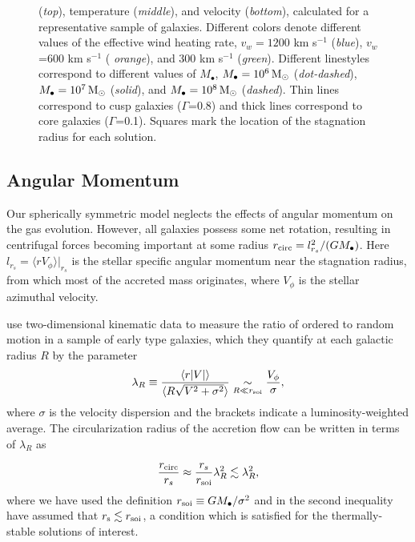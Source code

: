 \documentclass[usenatbib,fleqn]{mn2e}
\newcommand{\Mbh}[1][]{M_{\bullet#1}}
\newcommand{\vwO}{v_{w}}
\begin{document}
\begin{figure}
{    ({\it top}), temperature ({\it middle}), and velocity ({\it bottom}),
    calculated for a representative sample of galaxies.  Different colors
    denote different values of the effective wind heating rate,
    $\vwO=1200$ km s$^{-1}$ ({\it blue}), $\vwO$=600 km s$^{-1}$ ({\it
      orange}), and 300 km s$^{-1}$ ({\it green}).  Different
    linestyles correspond to different values of $\Mbh$, $\Mbh=10^6
    \Msun$ ({\it dot-dashed}), $\Mbh=10^7 \Msun$ ({\it solid}), and
    $\Mbh=10^8 \Msun$ ({\it dashed}). Thin lines correspond to cusp
    galaxies ($\Gamma$=0.8) and thick lines correspond to core
    galaxies ($\Gamma$=0.1). Squares mark the location of
    the stagnation radius for each solution.
 }
\end{figure}

  \subsection{Angular Momentum}
  \label{sec:rotation}

  Our spherically symmetric model neglects the effects of angular
  momentum on the gas evolution.  However, all galaxies possess some
  net rotation, resulting in centrifugal forces becoming important at
  some radius $r_{\rm circ} = l^{2}_{r_{s}}/(GM_{\bullet})$.  Here
  $l_{r_{s}} = \langle r V_{\phi}\rangle |_{r_s}$ is the stellar
  specific angular momentum near the stagnation radius, from which
  most of the accreted mass originates, where $V_{\phi}$ is the
  stellar azimuthal velocity.

  \citet{EmsellemCappellari+:2007a} use two-dimensional kinematic data
  to measure the ratio of ordered to random motion in a sample of
  early type galaxies, which they quantify at each galactic radius $R$
  by the parameter
  \begin{align}
    \lambda_R \equiv \frac{\langle r|V|\rangle}{\langle R\sqrt{V^2+\sigma^2}\rangle} \underset{R \ll r_{\rm soi}}\sim \frac{V_{\phi}}{\sigma},
  \end{align}
  where $\sigma$ is the velocity dispersion and the brackets indicate
  a luminosity-weighted average.  The circularization radius of the
  accretion flow can be written in terms of $\lambda_R$ as

\begin{equation}
\frac{r_{\rm circ}}{r_{s}} \approx \frac{r_{s}}{r_{\rm soi}}\lambda_{R}^{2} \lesssim \lambda_{R}^{2},
\label{eq:rcirc}
\end{equation}
where we have used the definition $r_{\rm soi} \equiv
GM_{\bullet}/\sigma^{2}$ and in the second inequality have assumed
that $r_{\rm s} \lesssim r_{\rm soi}$, a condition which is satisfied
for the thermally-stable solutions of interest.
\end{document}
